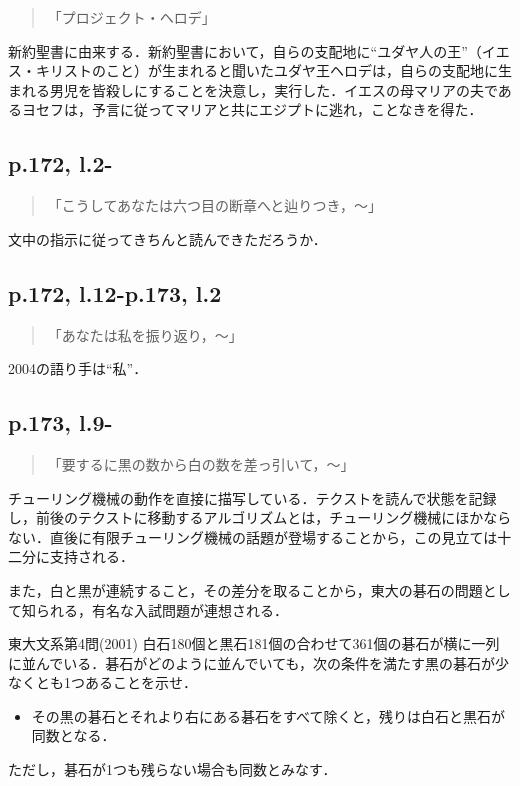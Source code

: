 \documentclass[10pt, a5paper, twoside]{ltjsarticle}
\begin{document}
            \begin{quote}
                「プロジェクト・ヘロデ」
            \end{quote}

            新約聖書に由来する．新約聖書において，自らの支配地に“ユダヤ人の王”（イエス・キリストのこと）が生まれると聞いたユダヤ王ヘロデは，自らの支配地に生まれる男児を皆殺しにすることを決意し，実行した．イエスの母マリアの夫であるヨセフは，予言に従ってマリアと共にエジプトに逃れ，ことなきを得た\cite{bible}．

        \subsection{p.172, l.2-}

            \begin{quote}
                「こうしてあなたは六つ目の断章へと辿りつき，〜」
            \end{quote}

            文中の指示に従ってきちんと読んできただろうか．

        \subsection{p.172, l.12-p.173, l.2}

            \begin{quote}
                「あなたは私を振り返り，〜」
            \end{quote}

            2004の語り手は“私”．

        \subsection{p.173, l.9-}

            \begin{quote}
                「要するに黒の数から白の数を差っ引いて，〜」
            \end{quote}

            チューリング機械の動作を直接に描写している．テクストを読んで状態を記録し，前後のテクストに移動するアルゴリズムとは，チューリング機械にほかならない．直後に有限チューリング機械の話題が登場することから，この見立ては十二分に支持される．

            また，白と黒が連続すること，その差分を取ることから，東大の碁石の問題として知られる，有名な入試問題が連想される．

            \begin{prb}{東大文系第4問(2001)}{}
                白石180個と黒石181個の合わせて361個の碁石が横に一列に並んでいる．碁石がどのように並んでいても，次の条件を満たす黒の碁石が少なくとも1つあることを示せ．
                \begin{itemize}
                    \item その黒の碁石とそれより右にある碁石をすべて除くと，残りは白石と黒石が同数となる．
                \end{itemize}
                ただし，碁石が1つも残らない場合も同数とみなす．
            \end{prb}
\end{document}
